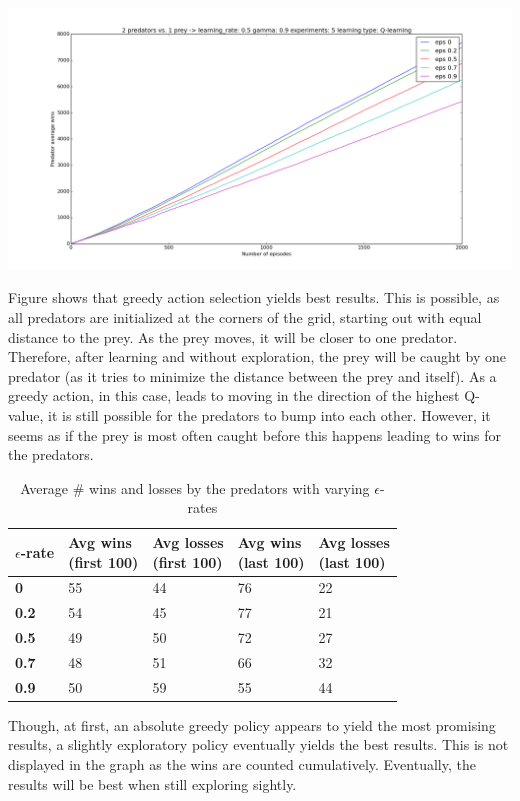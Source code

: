 \begin{center}
	\includegraphics[scale=0.3]{2_predators_epsilon_q_learning}
\end{center}

Figure  shows that greedy action selection yields best results. This is possible, as all predators are initialized at the corners of the grid, starting out with equal distance to the prey. As the prey moves, it will be closer to one predator. Therefore, after learning and without exploration, the prey will be caught by one predator (as it tries to minimize the distance between the prey and itself). As a greedy action, in this case, leads to moving in the direction of the highest Q-value, it is still possible for the predators to bump into each other. However, it seems as if the prey is most often caught before this happens leading to wins for the predators.

\begin{table}[H]
\begin{center}
\begin{tabular}{| l | l | l | l | l |}
\hline
\parbox{2cm}{\textbf{$\epsilon$-rate}} & \parbox{2cm}{\textbf{Avg wins \\ (first 100)}} & \parbox{2cm}{\textbf{Avg losses \\ (first 100)}} & \parbox{2cm}{\textbf{Avg wins \\ (last 100)}} & \parbox{2cm}{\textbf{Avg losses \\ (last 100)}} \\
\hline
\textbf{0} & 55 & 44 & 76 & 22 \\
\hline
\textbf{0.2} & 54 & 45 & 77 & 21 \\
\hline
\textbf{0.5} & 49 & 50 & 72 & 27 \\
\hline
\textbf{0.7} & 48 & 51 & 66 & 32 \\
\hline
\textbf{0.9} & 50 & 59 & 55 & 44 \\
\hline
\end{tabular}
\caption{Average \# wins and losses by the predators with varying $\epsilon$-rates}
\end{center}
\end{table}

Though, at first, an absolute greedy policy appears to yield the most promising results, a slightly exploratory policy eventually yields the best results. This is not displayed in the graph as the wins are counted cumulatively. Eventually, the results will be best when still exploring sightly.
